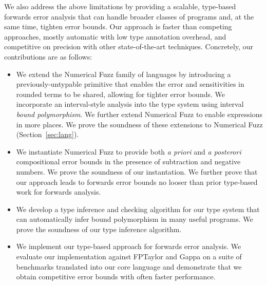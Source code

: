 We also address the above limitations by providing a scalable, type-based
forwards error analysis that can handle broader classes of programs and, at the
same time, tighten error bounds. Our approach is faster than competing
approaches, mostly automatic with low type annotation overhead, and competitive
on precision with other state-of-the-art techniques. Concretely, our
contributions are as follows:
\begin{itemize}
  \item We extend the Numerical Fuzz family of languages by introducing a
    previously-untypable primitive that enables the error and sensitivities in
    rounded terms to be shared, allowing for tighter error bounds. We
    incorporate an interval-style analysis into the type system using interval
    \textit{bound polymorphism}. We further extend Numerical Fuzz to enable
    expressions in more places. We prove the soundness of these extensions to
    Numerical Fuzz (Section~\ref{sec:lang}).

  \item We instantiate Numerical Fuzz to provide both \textit{a priori} and \textit{a
    posterori} compositional error bounds in the presence of subtraction and
    negative numbers. 
    We prove the soundness of our instantation. We further prove that our
    approach leads to forwards error bounds no looser than prior type-based work
    for forwards analysis. 

  \item We develop a type inference and checking algorithm for our type system
    that can automatically infer bound polymorphism in many useful programs. We
    prove the soundness of our type inference algorithm.

  \item We implement our type-based approach for forwards error analysis. We
    evaluate our implementation against FPTaylor and Gappa on a suite of
    benchmarks translated into our core language and demonstrate that we obtain
    competitive error bounds with often faster performance.
\end{itemize}
